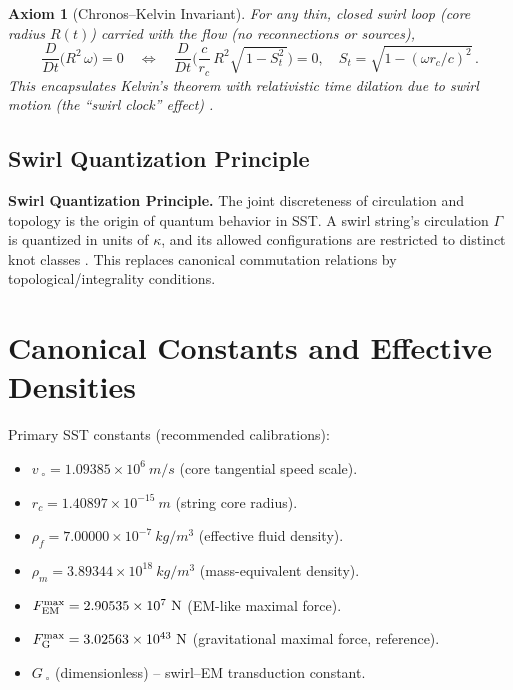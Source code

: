 \documentclass[11pt]{article}
\newtheorem{axiom}{Axiom}
\begin{document}
	\begin{axiom}[Chronos--Kelvin Invariant]\label{ax:CK}
	For any thin, closed swirl loop (core radius $R(t)$) carried with the flow (no reconnections or sources),
	\[
		\frac{D}{Dt}\Big(R^2\,\omega\Big)=0 \quad\Longleftrightarrow\quad
		\frac{D}{Dt}\Big(\frac{c}{r_c}\,R^2\sqrt{\,1 - S_t^2\,}\Big)=0,\quad S_t=\sqrt{1-(\omega r_c/c)^2}\,.
	\]
	This encapsulates Kelvin’s theorem with relativistic time dilation due to swirl motion (the ``swirl clock'' effect) \cite{Batchelor1967,Saffman1992,Iskandarani2025Canon034}.
	\end{axiom}

	\subsection{Swirl Quantization Principle}

	\textbf{Swirl Quantization Principle.} The joint discreteness of circulation and topology is the origin of quantum behavior in SST. A swirl string’s circulation $\Gamma$ is quantized in units of $\kappa$, and its allowed configurations are restricted to distinct knot classes \cite{Onsager1949,Feynman1955,Iskandarani2025Canon034}. This replaces canonical commutation relations by topological/integrality conditions.

	\section{Canonical Constants and Effective Densities}

	Primary SST constants (recommended calibrations):
	\begin{itemize}
		\item $v_{\!\!\;\circ} = 1.09385\times10^6~\si{m/s}$ (core tangential speed scale).
		\item $r_c = 1.40897\times10^{-15}~\si{m}$ (string core radius).
		\item $\rho_f = 7.00000\times10^{-7}~\si{kg/m^3}$ (effective fluid density).
		\item $\rho_m = 3.89344\times10^{18}~\si{kg/m^3}$ (mass-equivalent density).
		\item $F_{\rm EM}^{\max} = 2.90535\times10^7~\si{N}$ (EM-like maximal force).
		\item $F_{\rm G}^{\max} = 3.02563\times10^{43}~\si{N}$ (gravitational maximal force, reference).
		\item $G_{\!\!\;\circ}$ (dimensionless) -- swirl--EM transduction constant.
	\end{itemize}
\end{document}
